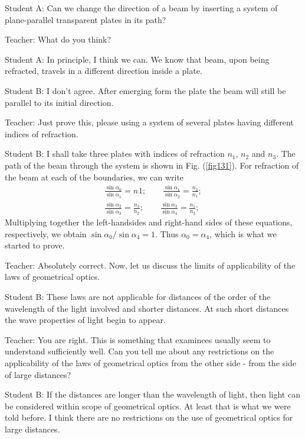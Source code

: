 \documentclass[a4paper,12pt]{book}
\begin{document}
{{\sc Student A:} Can we change the direction of a beam by inserting a system of plane-parallel transparent plates in its path?

{\sc Teacher:} What do you think?

{\sc Student A:} In principle, I think we can. We know that beam, upon being refracted, travels in a different direction inside a plate. 

{\sc Student B:} I don't agree. After emerging form the plate the beam will still be parallel to its initial direction.

{\sc Teacher:} Just prove this, please using a system of several plates having different indices of refraction.

{\sc Student B:} I shall take three plates with indices of refraction $n_{1}$, $n_{2}$ and $n_{3}$. The path of the beam through the system is shown in Fig. (\ref{fig131}). For refraction of the beam at each of the boundaries, we can write
\begin{eqnarray*}
\frac{\sin \alpha_{0}}{\sin \alpha_{1}} = n_{}1; \quad \quad \frac{\sin \alpha_{1}}{\sin \alpha_{2}} = \frac{n_{2}}{n_{1}}; \\
\frac{\sin \alpha_{2}}{\sin \alpha_{3}} = \frac{n_{3}}{n_{2}}; \quad \quad \frac{\sin \alpha_{3}}{\sin \alpha_{4}} = \frac{n_{1}}{n_{3}};
\end{eqnarray*}
Multiplying together the left-handsides and right-hand sides of these equations, respectively, we obtain $\sin \alpha_{0} / \sin \alpha_{4} =1 $. Thus $\alpha_{0} = \alpha_{4}$, which is what we started to prove.

{\sc Teacher:} Absolutely correct. Now, let us discuss the limits of applicability of the laws of geometrical optics.

{\sc Student B:} These laws are not applicable for distances of the order of the wavelength of the light involved and shorter distances. At such short distances the wave properties of light begin to appear.

{\sc Teacher:} You are right. This is something that examinees usually seem to understand sufficiently well. Can you tell me about any restrictions on the applicability of the laws of geometrical optics from the other side - from the side of large distances?

{\sc Student B:} If the distances are longer than the wavelength of light, then light can be considered within scope of geometrical optics. At least that is what we were told before. I think there are no restrictions on the use of geometrical optics for large distances.

}
\end{document}
